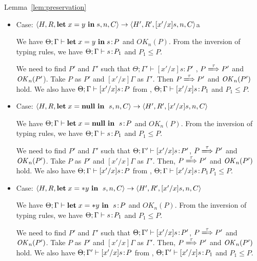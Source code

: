 \begin{pfof}{Lemma~\ref{lem:preservation}}
\begin{itemize}
  We need to find $P'$ such that \(\Theta; \Gamma \vdash \SKIP: P'\),
  \(P \xLongrightarrow{\tau} P'\) and \(\OK_n(P')\). Take $P$ as $P'$. Then,
  \(P \xLongrightarrow{\tau} P'\) and \(\OK_n(P')\) hold. We also have \(\Theta;
  \Gamma \vdash \SKIP: P'\) from , \(0 \le P\) and
  .

\item Case: \( \langle H, R, \mathbf{let}\; x = y\ \mathbf{in}\; s , n, C \rangle
  \rightarrow \langle H', R', [x'/x]s, n, C \rangle \)a

  We have \(\Theta; \Gamma \vdash \LET x = y \ \IN s \COL P\) and
  \(OK_{n}(P)\). From the inversion of typing rules, we have \(\Theta;
  \Gamma \vdash s\!:\! P_{1}\) and \(P_{1} \le P\).

  We need to find $P'$ and \(\Gamma'\) such that \(\Theta; \Gamma'
  \vdash [x'/x]s : P'\) , \(P \xLongrightarrow{\tau} P'\) and
  \(\mathit{OK}_n(P'\)). Take \(P\) as \(P'\) and \([x'/x]\Gamma\) as
  \(\Gamma'\). Then \( P \xLongrightarrow{\tau} P'\) and \(\OK_n(P')\)
  hold.  We also have \(\Theta; \Gamma \vdash [x'/x]s\!:\! P\) from
  , \(\Theta; \Gamma \vdash [x'/x]s\!:\! P_{1}\) and \( P_{1}
  \le P\).

\item Case: \( \langle H, R, \LET x = \NULL \ \IN \ s, n, C\rangle
  \rightarrow \langle H', R', [x'/x]s, n, C \rangle \)

  We have \(\Theta; \Gamma \vdash \mathbf{let}\; x = \mathbf{null} \ \mathbf{in}\; \ s\!:\! P\)
  and \(OK_{n}(P)\). From the inversion of typing rules, we have
  \(\Theta; \Gamma \vdash s\!:\! P_{1}\) and \( P_{1} \le P\).

  We need to find $P'$ and \(\Gamma'\) such that \(\Theta; \Gamma'
  \vdash [x'/x]s\!:\! P'\), \(P \xLongrightarrow{\tau} P'\) and
  \(\OK_n(P')\).  Take \(P\) as \(P'\) and \([x'/x]\Gamma\) as
  \(\Gamma'\).  Then, \(P \xLongrightarrow{\tau} P'\) and
  \(\OK_n(P')\) hold.  We also have \(\Theta; \Gamma \vdash
       [x'/x]s\!:\! P\) from , \(\Theta; \Gamma \vdash
       [x'/x]s\!:\! P_{1}\)\( P_{1} \le P\).

\item Case: \( \langle H, R, \mathbf{let}\; x = *y \ \mathbf{in}\; \ s, n, C\rangle
  \rightarrow \langle H', R', [x'/x]s, n, C\rangle \)

  We have \(\Theta; \Gamma \vdash \mathbf{let}\; x = *y \ \mathbf{in}\; \ s\!:\!  P\) and
  \(OK_{n}(P)\). From the inversion of typing rules, we have \(\Theta;
  \Gamma \vdash s\!:\! P_{1}\) and \(P_{1} \le P\).

  We need to find \(P'\) and \(\Gamma'\) such that \(\Theta; \Gamma'
  \vdash [x'/x]s\!:\! P'\), \(P \xLongrightarrow{\tau} P'\) and
  \(\OK_n(P')\). Take \(P\) as \(P'\) and \([x'/x]\Gamma\) as
  \(\Gamma'\). Then, \(P \xLongrightarrow{\tau} P'\) and \(\OK_n(P')\)
  hold.  We also have \(\Theta; \Gamma' \vdash [x'/x]s\!:\! P\) from
  , \(\Theta; \Gamma' \vdash [x'/x]s\!:\! P_{1}\) and \(P_{1}
  \le P\).


\end{itemize}
\end{pfof}

